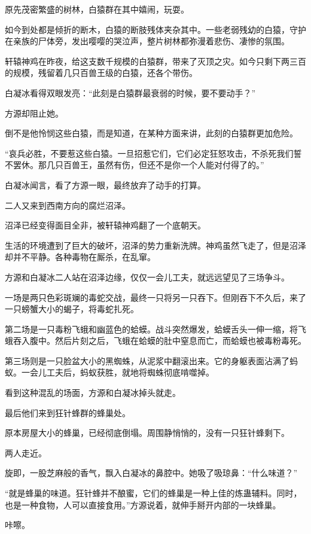 \begin{this_body}
原先茂密繁盛的树林，白猿群在其中嬉闹，玩耍。

如今到处都是倾折的断木，白猿的断肢残体夹杂其中。一些老弱残幼的白猿，守护在亲族的尸体旁，发出嘤嘤的哭泣声，整片树林都弥漫着悲伤、凄惨的氛围。

轩辕神鸡在昨夜，给这支数千规模的白猿群，带来了灭顶之灾。如今只剩下两三百的规模，残留着几只百兽王级的白猿，还各个带伤。

白凝冰看得双眼发亮：“此刻是白猿群最衰弱的时候，要不要动手？”

方源却阻止她。

倒不是他怜悯这些白猿，而是知道，在某种方面来讲，此刻的白猿群更加危险。

“哀兵必胜，不要惹这些白猿。一旦招惹它们，它们必定狂怒攻击，不杀死我们誓不罢休。那几只百兽王，虽然有伤，但还不是你一个人能对付得了的。”

白凝冰闻言，看了方源一眼，最终放弃了动手的打算。

二人又来到西南方向的腐烂沼泽。

沼泽已经变得面目全非，被轩辕神鸡翻了一个底朝天。

生活的环境遭到了巨大的破坏，沼泽的势力重新洗牌。神鸡虽然飞走了，但是沼泽却并不平静。各种毒物在厮杀，在乱窜。

方源和白凝冰二人站在沼泽边缘，仅仅一会儿工夫，就远远望见了三场争斗。

一场是两只色彩斑斓的毒蛇交战，最终一只将另一只吞下。但刚吞下不久后，来了一只螃蟹大小的蝎子，将毒蛇扎死。

第二场是一只毒粉飞蛾和幽蓝色的蛤蟆。战斗突然爆发，蛤蟆舌头一伸一缩，将飞蛾吞入腹中。然后片刻之后，飞蛾在蛤蟆的肚中窒息而亡，而蛤蟆也被毒粉毒死。

第三场则是一只脸盆大小的黑蜘蛛，从泥浆中翻滚出来。它的身躯表面沾满了蚂蚁。一会儿工夫后，蚂蚁获胜，就地将蜘蛛彻底啃噬掉。

看到这种混乱的场面，方源和白凝冰掉头就走。

最后他们来到狂针蜂群的蜂巢处。

原本房屋大小的蜂巢，已经彻底倒塌。周围静悄悄的，没有一只狂针蜂剩下。

两人走近。

旋即，一股芝麻般的香气，飘入白凝冰的鼻腔中。她吸了吸琼鼻：“什么味道？”

“就是蜂巢的味道。狂针蜂并不酿蜜，它们的蜂巢是一种上佳的炼蛊辅料。同时，也是一种食物，人可以直接食用。”方源说着，就伸手掰开内部的一块蜂巢。

咔嚓。


\end{this_body}
